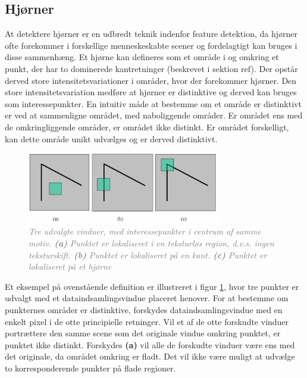 \subsection{Hjørner}\label{subsec:corner}
At detektere hjørner er en udbredt teknik indenfor feature detektion, da hjørner ofte forekommer i forskellige menneskeskabte scener og fordelagtigt kan bruges i disse sammenhæng.
Et hjørne kan defineres som et område i og omkring et punkt, der har to dominerede kantretninger (beskrevet i sektion ref). Der opstår derved store intensitetsvariationer i områder, hvor der forekommer hjørner.
Den store intensitetsvariation medføre at hjørner er distinktive og derved kan bruges som interessepunkter. En intuitiv måde at bestemme om et område er distinktivt er ved at sammenligne området, med naboliggende områder. Er området ens med de omkringliggende områder, er området ikke distinkt. Er området forskelligt, kan dette område unikt udvælges og er derved distinktivt.
\begin{figure}[H]
    \centering
    \includegraphics[width=0.75\textwidth]{fig/6.png}
    \vspace{-1em}   
    \begin{center}    
    \caption{\textcolor{gray}{\footnotesize \textit{
     Tre udvalgte vinduer, med interessepunkter i centrum af samme motiv. \textbf{(a)} Punktet er lokaliseret i en teksturløs region, d.v.s. ingen teksturskift. \textbf{(b)} Punktet er lokaliseret på en kant. \textbf{(c)} Punktet er lokaliseret på et hjørne }}}
    \label{fig:2}
     \end{center}
    \vspace{-2.7em}  
  \end{figure}  
\noindent
Et eksempel på ovenstående definition er illustreret i figur \ref{fig:2}, hvor tre punkter er udvalgt med et dataindsamlingsvindue placeret henover. For at bestemme om punkternes områder er distinktive, forskydes dataindsamlingsvindue med en enkelt pixel i de otte principielle retninger. Vil et af de otte forskudte vinduer portrættere den samme scene som det originale vindue omkring punktet, er punktet ikke distinkt. Forskydes  \textbf{(a)} vil alle de forskudte vinduer være ens med det originale, da området omkring er fladt. Det vil ikke være muligt at udvælge to korresponderende punkter på flade regioner.
